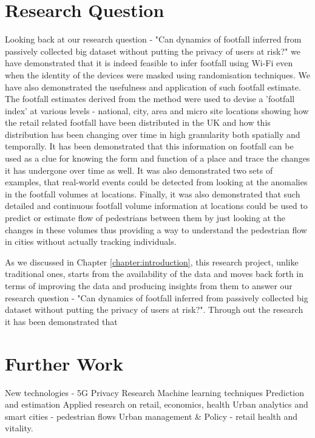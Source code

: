 \section{Research Question}
Looking back at our research question - "Can dynamics of footfall inferred from passively collected big dataset without putting the privacy of users at risk?"
we have demonstrated that it is indeed feasible to infer footfall using Wi-Fi even when the identity of the devices were masked using randomisation techniques.
We have also demonstrated the usefulness and application of such footfall estimate.
The footfall estimates derived from the method were used to devise a 'footfall index' at various levels - national, city, area and micro site locations showing how the retail related footfall have been distributed in the UK and how this distribution has been changing over time in high granularity both spatially and temporally.
It has been demonstrated that this information on footfall can be used as a clue for knowing the form and function of a place and trace the changes it has undergone over time as well.
It was also demonstrated two sets of examples, that real-world events could be detected from looking at the anomalies in the footfall volumes at locations.
Finally, it was also demonstrated that such detailed and continuous footfall volume information at locations could be used to predict or estimate flow of pedestrians between them by just looking at the changes in these volumes thus providing a way to understand the pedestrian flow in cities without actually tracking individuals.

As we discussed in Chapter \ref{chapter:introduction}, this research project, unlike traditional ones, starts from the availability of the data and moves back forth in terms of improving the data and producing insights from them to answer our research question - "Can dynamics of footfall inferred from passively collected big dataset without putting the privacy of users at risk?". Through out the research it has been demonstrated that

\section{Further Work}

New technologies - 5G
Privacy Research
Machine learning techniques
Prediction and estimation
Applied research on retail, economics, health
Urban analytics and smart cities - pedestrian flows
Urban management \& Policy - retail health and vitality.


